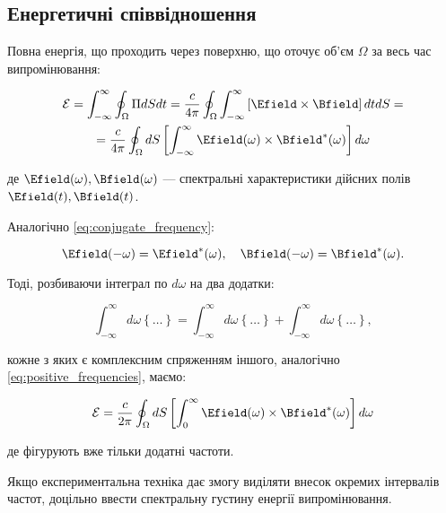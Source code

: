 \subsection*{Енергетичні співвідношення}

Повна енергія, що проходить через поверхню, що оточує об’єм \( \Omega \) за весь час випромінювання:

\begin{multline*}
\mathcal{E} = \int_{-\infty}^{\infty} \oint_{\Omega} \Pi dS dt = \frac{c}{4\pi} \oint_{\Omega} \int_{-\infty}^{\infty} \left[ \Efield \times \Bfield
\right] dtdS = \\
= \frac{c}{4\pi} \oint_{\Omega} dS \left[ \int_{-\infty}^{\infty} \Efield(\omega) \times \Bfield^{*}(\omega) \right] d\omega
\end{multline*}

де \( \Efield(\omega), \Bfield(\omega) \) --- спектральні характеристики дійсних полів \( \Efield(t), \Bfield(t) \).

Аналогічно \eqref{eq:conjugate_frequency}:

\begin{equation*}
\Efield(-\omega) = \Efield^{*}(\omega), \quad \Bfield(-\omega) = \Bfield^{*}(\omega).
\end{equation*}

Тоді, розбиваючи інтеграл по \( d\omega \) на два додатки:

\begin{equation*}
\int_{-\infty}^{\infty} d\omega \left\{ \ldots \right\} = \int_{-\infty}^{\infty} d\omega \left\{ \ldots \right\} + \int_{-\infty}^{\infty} d\omega
\left\{ \ldots \right\},
\end{equation*}

кожне з яких є комплексним спряженням іншого, аналогічно \eqref{eq:positive_frequencies}, маємо:

\begin{equation}
\mathcal{E} = \frac{c}{2\pi} \oint_{\Omega} dS \left[ \int_{0}^{\infty} \Efield(\omega) \times \Bfield^{*}(\omega) \right] d\omega
\label{eq:energy_positive_frequencies}
\end{equation}

де фігурують вже тільки додатні частоти.

Якщо експериментальна техніка дає змогу виділяти внесок окремих інтервалів частот, доцільно ввести спектральну густину енергії випромінювання.


